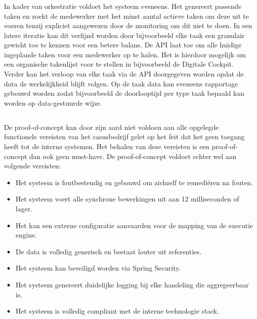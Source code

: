 \subsubsection{}%
\label{subsubsec:orkestratie}
In kader van orkestratie voldoet het systeem eveneens. Het genereert passende taken en zoekt de medewerker met het minst aantal actieve taken om deze uit te voeren tenzij expliciet aangewezen door de monitoring om dit niet te doen. In een latere iteratie kan dit verfijnd worden door bijvoorbeeld elke taak een granulair gewicht toe te kennen voor een betere balans. De API laat toe om alle huidige ingeplande taken voor een medewerker op te halen. Het is hierdoor mogelijk om een organische takenlijst voor te stellen in bijvoorbeeld de Digitale Cockpit. Verder kan het verloop van elke taak via de API doorgegeven worden opdat de data de werkelijkheid blijft volgen. Op de taak data kan eveneens rapportage gebouwd worden zodat bijvoorbeeld de doorlooptijd per type taak bepaald kan worden op data-gestuurde wijze.\newline
\subsection{}%
\label{subsec:niet-functionele vereisten}
De proof-of-concept kan door zijn aard niet voldoen aan alle opgelegde functionele vereisten van het casusbedrijf gelet op het feit dat het geen toegang heeft tot de interne systemen. Het behalen van deze vereisten is een proof-of-concept dan ook geen must-have. De proof-of-concept voldoet echter wel aan volgende vereisten:
\begin{itemize}
  \item Het systeem is foutbestendig en gebouwd om zichzelf te remediëren na fouten.
  \item Het systeem voert alle synchrone bewerkingen uit aan 12 milliseconden of lager.
  \item Het kan een externe configuratie aanvaarden voor de mapping van de executie engine.
  \item De data is volledig generisch en bestaat louter uit referenties.
  \item Het systeem kan beveiligd worden via Spring Security.
  \item Het systeem genereert duidelijke logging bij elke handeling die aggregeerbaar is.
  \item Het systeem is volledig compliant met de interne technologie stack.
\end{itemize}

